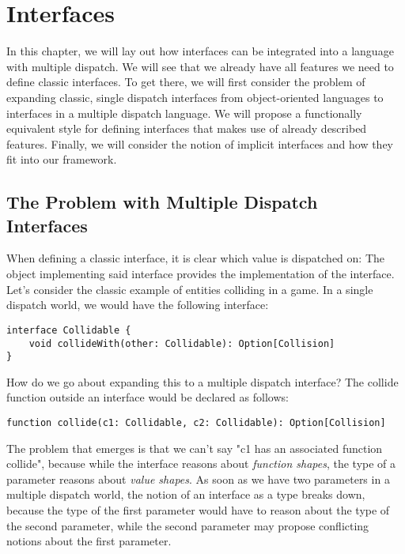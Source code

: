 \chapter{Interfaces}

In this chapter, we will lay out how interfaces can be integrated into a language with multiple dispatch. We will see that we already have all features we need to define classic interfaces. To get there, we will first consider the problem of expanding classic, single dispatch interfaces from object-oriented languages to interfaces in a multiple dispatch language. We will propose a functionally equivalent style for defining interfaces that makes use of already described features. Finally, we will consider the notion of implicit interfaces and how they fit into our framework.



\section{The Problem with Multiple Dispatch Interfaces}

When defining a classic interface, it is clear which value is dispatched on: The object implementing said interface provides the implementation of the interface. Let's consider the classic example of entities colliding in a game. In a single dispatch world, we would have the following interface:

\begin{lstlisting}
interface Collidable {
    void collideWith(other: Collidable): Option[Collision]
}
\end{lstlisting}

\noindent How do we go about expanding this to a multiple dispatch interface? The collide function outside an interface would be declared as follows:

\begin{lstlisting}
function collide(c1: Collidable, c2: Collidable): Option[Collision]
\end{lstlisting}

\noindent The problem that emerges is that we can't say "c1 has an associated function collide", because while the interface reasons about \textit{function shapes}, the type of a parameter reasons about \textit{value shapes}. As soon as we have two parameters in a multiple dispatch world, the notion of an interface as a type breaks down, because the type of the first parameter would have to reason about the type of the second parameter, while the second parameter may propose conflicting notions about the first parameter. 

